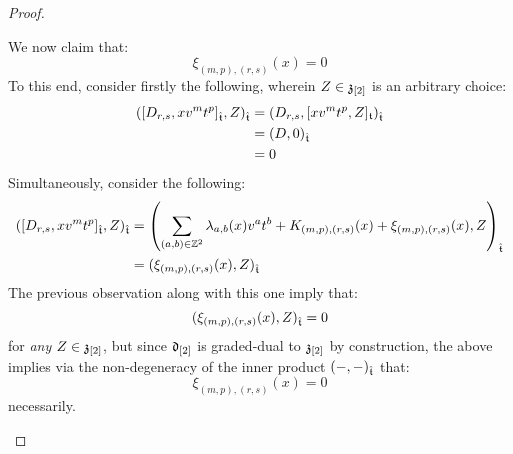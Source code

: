 \begin{proof}
\begin{enumerate}
                    We now claim that:
                        $$\xi_{(m, p), (r, s)}(x) = 0$$
                    To this end, consider firstly the following, wherein $Z \in \mathfrak{z}_{[2]}$ is an arbitrary choice:
                        $$
                            \begin{aligned}
                                ( [D_{r, s}, x v^m t^p]_{\hat{\mathfrak{t}}}, Z )_{\hat{\mathfrak{t}}} & = ( D_{r, s}, [x v^m t^p, Z]_{\mathfrak{t}} )_{\hat{\mathfrak{t}}}
                                \\
                                & = (D, 0)_{\hat{\mathfrak{t}}}
                                \\
                                & = 0
                            \end{aligned}
                        $$
                    Simultaneously, consider the following:
                        $$
                            \begin{aligned}
                                ( [D_{r, s}, x v^m t^p]_{\hat{\mathfrak{t}}}, Z )_{\hat{\mathfrak{t}}} & = \left( \sum_{(a, b) \in \mathbb{Z}^2} \lambda_{a, b}(x) v^a t^b + K_{(m, p), (r, s)}(x) + \xi_{(m, p), (r, s)}(x), Z \right)_{\hat{\mathfrak{t}}}
                                \\
                                & = ( \xi_{(m, p), (r, s)}(x), Z )_{\hat{\mathfrak{t}}}
                            \end{aligned}
                        $$
                    The previous observation along with this one imply that:
                        $$( \xi_{(m, p), (r, s)}(x), Z )_{\hat{\mathfrak{t}}} = 0$$
                    for \textit{any} $Z \in \mathfrak{z}_{[2]}$, but since $\mathfrak{d}_{[2]}$ is graded-dual to $\mathfrak{z}_{[2]}$ by construction, the above implies via the non-degeneracy of the inner product $(-, -)_{\hat{\mathfrak{t}}}$ that:
                        $$\xi_{(m, p), (r, s)}(x) = 0$$
                    necessarily. 
    

\end{enumerate}
\end{proof}
